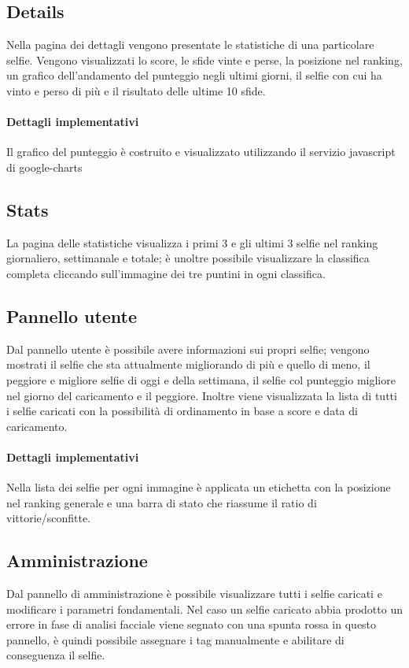 \documentclass{article}
\begin{document}
\subsection{Details}
Nella pagina dei dettagli vengono presentate le statistiche di una particolare selfie. Vengono visualizzati lo score, le sfide vinte e perse, la posizione nel ranking, un grafico dell'andamento del punteggio negli ultimi giorni, il selfie con cui ha vinto e perso di più e il risultato delle ultime 10 sfide.

\paragraph{Dettagli implementativi}
Il grafico del punteggio è costruito e visualizzato utilizzando il servizio javascript di google-charts

\subsection{Stats}
La pagina delle statistiche visualizza i primi 3 e gli ultimi 3 selfie nel ranking giornaliero, settimanale e totale; è unoltre possibile visualizzare la classifica completa cliccando sull'immagine dei tre puntini in ogni classifica.

\subsection{Pannello utente}
Dal pannello utente è possibile avere informazioni sui propri selfie; vengono mostrati il selfie che sta attualmente migliorando di più e quello di meno, il peggiore e migliore selfie di oggi e della settimana, il selfie col punteggio migliore nel giorno del caricamento e il peggiore. Inoltre viene visualizzata la lista di tutti i selfie caricati con la possibilità di ordinamento in base a score e data di caricamento.

\paragraph{Dettagli implementativi}
Nella lista dei selfie per ogni immagine è applicata un etichetta con la posizione nel ranking generale e una barra di stato che riassume il ratio di vittorie/sconfitte.

\subsection{Amministrazione}
Dal pannello di amministrazione è possibile visualizzare tutti i selfie caricati e modificare i parametri fondamentali. Nel caso un selfie caricato abbia prodotto un errore in fase di analisi facciale viene segnato con una spunta rossa in questo pannello, è quindi possibile assegnare i tag manualmente e abilitare di conseguenza il selfie.
\end{document}
